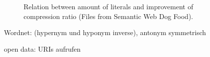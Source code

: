 \documentclass[a4paper]{scrartcl}
\begin{document}
\begin{figure}[h]
	\centering
	\hfill
	\caption{Relation between amount of literals and improvement of compression ratio (Files from Semantic Web Dog Food).}
\end{figure}



Wordnet: (hypernym und hyponym inverse), antonym symmetrisch

open data: URIs aufrufen
\end{document}
